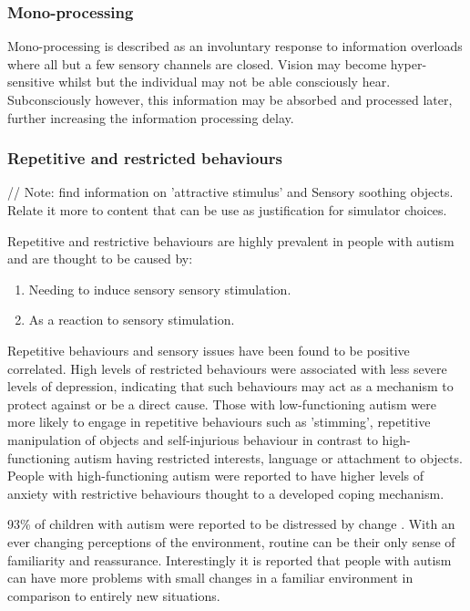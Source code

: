 \documentclass[11pt]{report}
\begin{document}
\subsubsection{Mono-processing}
Mono-processing is described as an involuntary response to information overloads where all but a few sensory channels are closed. Vision may become hyper-sensitive whilst but the individual may not be able consciously hear. Subconsciously however, this information may be absorbed and processed later, further increasing the information processing delay. 


\subsubsection{Repetitive and restricted behaviours}

// Note: find information on 'attractive stimulus' and Sensory soothing objects. Relate it more to content that can be use as justification for simulator choices.

Repetitive and restrictive behaviours are highly prevalent in people with autism and are thought to be caused by:
\begin{enumerate}
\item Needing to induce sensory sensory stimulation\cite{rrsyouth}.
\item As a reaction to sensory stimulation\cite{rrsyouth}.
\end{enumerate}

Repetitive behaviours and sensory issues have been found to be positive correlated\cite{rrs_sensory}\cite{rssyouth}. High levels of restricted behaviours were associated with less severe levels of depression, indicating that such behaviours may act as a mechanism to protect against or be a direct cause\cite{rss_ensory}. Those with low-functioning autism were more likely to engage in repetitive behaviours such as 'stimming', repetitive manipulation of objects and self-injurious behaviour in contrast to high-functioning autism having restricted interests, language or attachment to objects\cite{rss_sensory}. People with high-functioning autism were reported to have higher levels of anxiety with restrictive behaviours thought to a developed coping mechanism\cite{rssyouth}.

93\% of children with autism were reported to be distressed by change \cite{fears}. With an ever changing perceptions of the environment, routine can be their only sense of familiarity and reassurance. Interestingly it is reported that people with autism can have more problems with small changes in a familiar environment in comparison to entirely new situations\cite{bayes}.  
\end{document}
